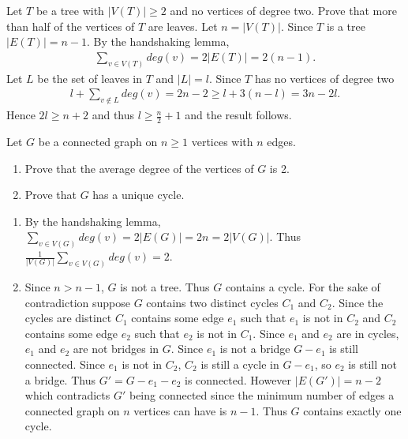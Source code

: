 \begin{enumerate}
     Let $T$ be a tree with $|V(T)|\geq 2$ and no vertices of degree two. Prove that more than half of the vertices of $T$ are leaves.
    \answer Let $n=|V(T)|$. Since $T$ is a tree $|E(T)|=n-1$. By the handshaking lemma, 
    \begin{align*}
        \sum_{v\in V(T)} deg(v)=2|E(T)|=2(n-1).    
    \end{align*} 
    Let $L$ be the set of leaves in $T$ and $|L|=l$. Since $T$ has no vertices of degree two 
    \begin{align*}
            l+\sum_{v\notin L} deg(v)=2n-2\geq l+3(n-l)=3n-2l.    
    \end{align*}
    Hence $2l\geq n+2$ and thus $l\geq \frac{n}{2}+1$ and the result follows. 
    
     Let $G$ be a connected graph on $n\geq 1$ vertices with $n$ edges.
    \begin{enumerate}
        \item Prove that the average degree of the vertices of $G$ is 2.
        \item Prove that $G$ has a unique cycle.
    \end{enumerate}
    \answer 
    \begin{enumerate}
        \item By the handshaking lemma, $\sum_{v\in V(G)} deg(v)=2|E(G)|=2n=2|V(G)|$. Thus $\frac{1}{|V(G)|}\sum_{v\in V(G)}deg(v)=2$. 
        \item Since $n>n-1$, $G$ is not a tree. Thus $G$ contains a cycle. For the sake of contradiction suppose $G$ contains two distinct cycles $C_1$ and $C_2$. Since the cycles are distinct $C_1$ contains some edge $e_1$ such that $e_1$ is not in $C_2$ and $C_2$ contains some edge $e_2$ such that $e_2$ is not in $C_1$. Since $e_1$ and $e_2$ are in cycles, $e_1$ and $e_2$ are not bridges in $G$. Since $e_1$ is not a bridge $G-e_1$ is still connected. Since $e_1$ is not in $C_2$, $C_2$ is still a cycle in $G-e_1$, so $e_2$ is still not a bridge. Thus $G'=G-e_1-e_2$ is connected. However $|E(G')|=n-2$ which contradicts $G'$ being connected since the minimum number of edges a connected graph on $n$ vertices can have is $n-1$. Thus $G$ contains exactly one cycle. 
    \end{enumerate}
    

\end{enumerate}
